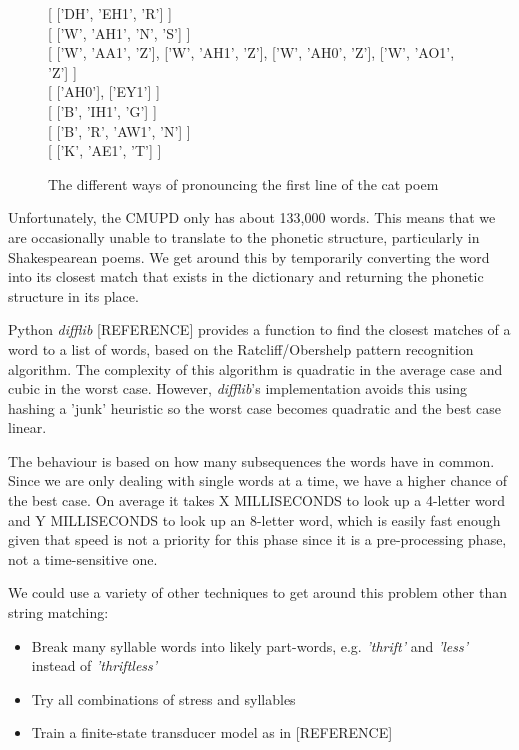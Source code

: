\begin{figure}
\centering
{[ {['DH', 'EH1', 'R']} ]} \\
{[ {['W', 'AH1', 'N', 'S']} ]}\\
{[ {['W', 'AA1', 'Z']}, {['W', 'AH1', 'Z']}, {['W', 'AH0', 'Z']}, {['W', 'AO1', 'Z']} ]}\\
{[ {['AH0']}, {['EY1']} ]}\\
{[ {['B', 'IH1', 'G']} ]}\\
{[ {['B', 'R', 'AW1', 'N']} ]}\\
{[ {['K', 'AE1', 'T']} ]}
\caption{The different ways of pronouncing the first line of the cat poem}
\label{fig:catpronun}
\end{figure}

Unfortunately, the CMUPD only has about 133,000 words. This means that we are occasionally unable to translate to the phonetic structure, particularly in Shakespearean poems. We get around this by temporarily converting the word into its closest match that exists in the dictionary and returning the phonetic structure in its place.

Python \textit{difflib} [REFERENCE] provides a function to find the closest matches of a word to a list of words, based on the Ratcliff/Obershelp pattern recognition algorithm. The complexity of this algorithm is quadratic in the average case and cubic in the worst case. However, \textit{difflib}'s implementation avoids this using hashing a 'junk' heuristic so the worst case becomes quadratic and the best case linear. 

The behaviour is based on  how many subsequences the words have in common. Since we are only dealing with single words at a time, we have a higher chance of the best case. On average it takes X MILLISECONDS to look up a 4-letter word and Y MILLISECONDS to look up an 8-letter word, which is easily fast enough given that speed is not a priority for this phase since it is a pre-processing phase, not a time-sensitive one.

We could use a variety of other techniques to get around this problem other than string matching:
\begin{itemize}
\item{Break many syllable words into likely part-words, e.g. \textit{'thrift'} and \textit{'less'} instead of \textit{'thriftless'}}
\item{Try all combinations of stress and syllables}
\item{Train a finite-state transducer model as in \cite{dobrivsek2010towards}[REFERENCE]}
\end{itemize}

